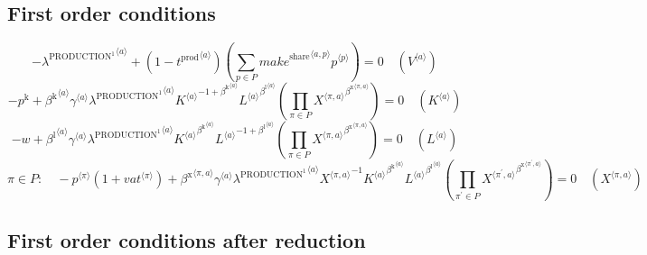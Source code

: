 \subsection{First order conditions}

\begin{equation}
-{\lambda^{\mathrm{PRODUCTION}^{\mathrm{1}}}}^{\langle a\rangle} + \left(1 - {t^{\mathrm{prod}}}^{\langle a\rangle}\right) \left(\sum_{p\in P} {{{m\!a\!k\!e}^{\mathrm{share}}}^{\langle a,p\rangle}} {{p}^{\langle p\rangle}}\right) = 0
 \quad \left({V}^{\langle a\rangle}\right)
\end{equation}
\begin{equation}
-p^{\mathrm{k}} + {{\beta^{\mathrm{k}}}^{\langle a\rangle}} {{\gamma}^{\langle a\rangle}} {{\lambda^{\mathrm{PRODUCTION}^{\mathrm{1}}}}^{\langle a\rangle}} {{{K}^{\langle a\rangle}}^{-1 + {\beta^{\mathrm{k}}}^{\langle a\rangle}}} {{{L}^{\langle a\rangle}}^{{\beta^{\mathrm{l}}}^{\langle a\rangle}}} \left(\prod_{\pi\in P} {{X}^{\langle \pi,a\rangle}}^{{\beta^{\mathrm{x}}}^{\langle \pi,a\rangle}}\right) = 0
 \quad \left({K}^{\langle a\rangle}\right)
\end{equation}
\begin{equation}
-w + {{\beta^{\mathrm{l}}}^{\langle a\rangle}} {{\gamma}^{\langle a\rangle}} {{\lambda^{\mathrm{PRODUCTION}^{\mathrm{1}}}}^{\langle a\rangle}} {{{K}^{\langle a\rangle}}^{{\beta^{\mathrm{k}}}^{\langle a\rangle}}} {{{L}^{\langle a\rangle}}^{-1 + {\beta^{\mathrm{l}}}^{\langle a\rangle}}} \left(\prod_{\pi\in P} {{X}^{\langle \pi,a\rangle}}^{{\beta^{\mathrm{x}}}^{\langle \pi,a\rangle}}\right) = 0
 \quad \left({L}^{\langle a\rangle}\right)
\end{equation}
\begin{equation}
\pi\in P\colon\quad -{{p}^{\langle \pi\rangle}} \left(1 + {{v\!a\!t}}^{\langle \pi\rangle}\right) + {{\beta^{\mathrm{x}}}^{\langle \pi,a\rangle}} {{\gamma}^{\langle a\rangle}} {{\lambda^{\mathrm{PRODUCTION}^{\mathrm{1}}}}^{\langle a\rangle}} {{X}^{\langle \pi,a\rangle}}^{-1} {{{K}^{\langle a\rangle}}^{{\beta^{\mathrm{k}}}^{\langle a\rangle}}} {{{L}^{\langle a\rangle}}^{{\beta^{\mathrm{l}}}^{\langle a\rangle}}} \left(\prod_{\pi^{\prime}\in P} {{X}^{\langle \pi^{\prime},a\rangle}}^{{\beta^{\mathrm{x}}}^{\langle \pi^{\prime},a\rangle}}\right) = 0
 \quad \left({X}^{\langle \pi,a\rangle}\right)
\end{equation}


\subsection{First order conditions after reduction}

